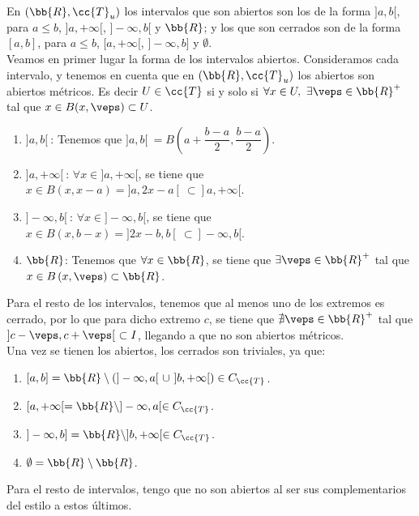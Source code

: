 \begin{ejercicio}
    En $(\bb{R}, \cc{T}_u)$ los intervalos que son abiertos son los de la forma $]a,b[$, para $a\leq b$, $]a,+\infty[$, $]-\infty, b[$ y $\bb{R}$; y los que son cerrados son de la forma $[a,b]$, para $a\leq b$, $[a,+\infty[$, $]-\infty, b]$ y $\emptyset$.\\

    Veamos en primer lugar la forma de los intervalos abiertos. Consideramos cada intervalo, y tenemos en cuenta que en $(\bb{R},\cc{T}_u)$ los abiertos son abiertos métricos. Es decir $U\in \cc{T}$ si y solo si $\forall x\in U,~\exists \veps\in \bb{R}^+$ tal que $x\in B(x,\veps)\subset U$.
    \begin{enumerate}
        \item $]a,b[~$: Tenemos que $]a,b[~=B\left(a+\dfrac{b-a}{2}, \dfrac{b-a}{2}\right)$.
        \item $]a,+\infty[~$: $\forall x\in ]a,+\infty[$, se tiene que $x\in B\left(x,x-a\right)=]a,2x-a[~\subset ]a,+\infty[$.
        \item $]-\infty,b[~$: $\forall x\in ]-\infty,b[$, se tiene que $x\in B\left(x,b-x\right)=]2x-b,b[~\subset ]-\infty,b[$.
        \item $\bb{R}$: Tenemos que $\forall x\in \bb{R}$, se tiene que $\exists \veps\in \bb{R}^+$ tal que $x\in B\left(x,\veps\right)\subset \bb{R}$.
    \end{enumerate}
    Para el resto de los intervalos, tenemos que al menos uno de los extremos es cerrado, por lo que para dicho extremo $c$, se tiene que $\nexists \veps\in \bb{R}^+$ tal que $]c-\veps, c+\veps[~\subset I$, llegando a que no son abiertos métricos.\\

    Una vez se tienen los abiertos, los cerrados son triviales, ya que:
    \begin{enumerate}
        \item $[a,b]=\bb{R}\setminus \left(]-\infty,a[~\cup~ ]b,+\infty[\right)\in C_\cc{T}$.
        \item $[a,+\infty[ = \bb{R}\setminus ]-\infty, a[\in C_\cc{T}$.
        \item $]-\infty,b] = \bb{R}\setminus ]b,+\infty[\in C_\cc{T}$.
        \item $\emptyset = \bb{R}\setminus \bb{R}$.
    \end{enumerate}
    Para el resto de intervalos, tengo que no son abiertos al ser sus complementarios del estilo a estos últimos.
\end{ejercicio}

